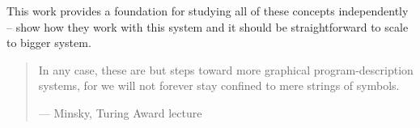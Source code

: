 \documentclass{llncs}
\begin{document}
This work provides a foundation for studying all of these concepts independently -- show how they work with this system and it should be straightforward to scale to bigger system.

\begin{quote}
In any case, these are but steps toward more graphical program-description systems, for we will not forever stay confined to mere strings of symbols.

--- Minsky, Turing Award lecture
\end{quote}

%
%


\end{document}
